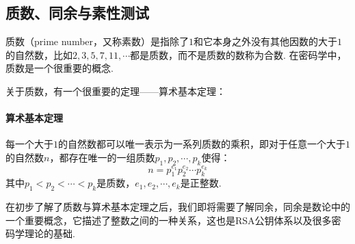 \documentclass{book}
\numberwithin{equation}{subsubsection}
\begin{document}
\subsection{质数、同余与素性测试}
质数（prime number，又称素数）是指除了$1$和它本身之外没有其他因数的大于$1$的自然数，比如$2,3,5,7,11,\cdots$都是质数，而不是质数的数称为合数.
在密码学中，质数是一个很重要的概念.\par
关于质数，有一个很重要的定理——算术基本定理：
\paragraph{\textbf{算术基本定理}}
每一个大于$1$的自然数都可以唯一表示为一系列质数的乘积，即对于任意一个大于$1$的自然数$n$，都存在唯一的一组质数$p_1,p_2,\cdots,p_k$使得：
\begin{equation}
    n=p_1^{e_1}p_2^{e_2}\cdots p_k^{e_k}
    \nonumber
\end{equation}
其中$p_1<p_2<\cdots<p_k$是质数，$e_1,e_2,\cdots,e_k$是正整数.\par
在初步了解了质数与算术基本定理之后，我们即将需要了解同余，同余是数论中的一个重要概念，它描述了整数之间的一种关系，这也是RSA公钥体系以及很多密码学理论的基础.\par
\end{document}
